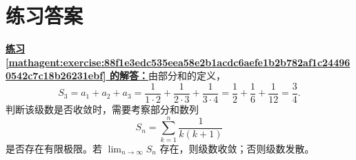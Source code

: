 \documentclass[UTF8,fontset=fandol,11pt]{ctexart}
\begin{document}
\section*{练习答案}
\par\noindent\textbf{\hyperref[mathagent:exercise:88f1e3edc535eea58e2b1acdc6aefe1b2b782af1c244960542c7c18b26231ebf]{练习 \ref*{mathagent:exercise:88f1e3edc535eea58e2b1acdc6aefe1b2b782af1c244960542c7c18b26231ebf} 的解答：}}由部分和的定义，
\[
S_3=a_1+a_2+a_3
=\frac{1}{1\cdot2}+\frac{1}{2\cdot3}+\frac{1}{3\cdot4}
=\frac12+\frac16+\frac1{12}
=\frac34.
\]
判断该级数是否收敛时，需要考察部分和数列
\[
S_n=\sum_{k=1}^{n}\frac{1}{k(k+1)}
\]
是否存在有限极限。若 $\lim_{n\to\infty}S_n$ 存在，则级数收敛；否则级数发散。\par
\end{document}
